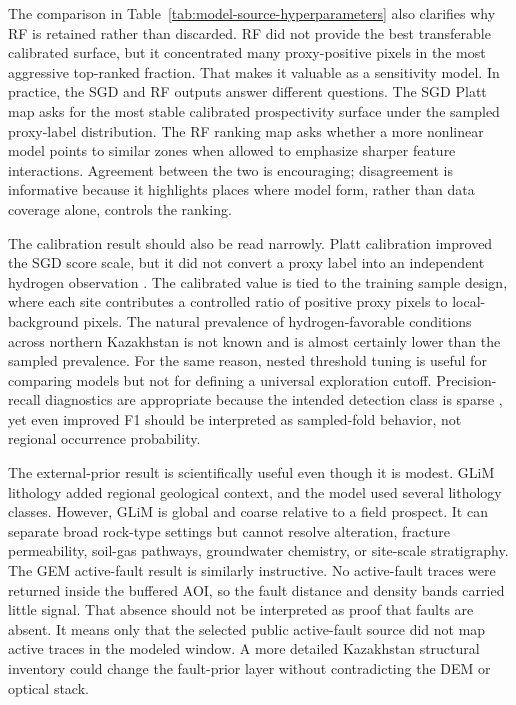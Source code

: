 \documentclass[numrefs]{interact}
\let\cite\citep
\theoremstyle{plain}%
\theoremstyle{definition}
\theoremstyle{remark}
\begin{document}
The comparison in Table~\ref{tab:model-source-hyperparameters} also clarifies why RF is retained rather than discarded. RF did not provide the best transferable calibrated surface, but it concentrated many proxy-positive pixels in the most aggressive top-ranked fraction. That makes it valuable as a sensitivity model. In practice, the SGD and RF outputs answer different questions. The SGD Platt map asks for the most stable calibrated prospectivity surface under the sampled proxy-label distribution. The RF ranking map asks whether a more nonlinear model points to similar zones when allowed to emphasize sharper feature interactions. Agreement between the two is encouraging; disagreement is informative because it highlights places where model form, rather than data coverage alone, controls the ranking.

The calibration result should also be read narrowly. Platt calibration improved the SGD score scale, but it did not convert a proxy label into an independent hydrogen observation \cite{platt1999probabilistic}. The calibrated value is tied to the training sample design, where each site contributes a controlled ratio of positive proxy pixels to local-background pixels. The natural prevalence of hydrogen-favorable conditions across northern Kazakhstan is not known and is almost certainly lower than the sampled prevalence. For the same reason, nested threshold tuning is useful for comparing models but not for defining a universal exploration cutoff. Precision-recall diagnostics are appropriate because the intended detection class is sparse \cite{saito2015precision}, yet even improved F1 should be interpreted as sampled-fold behavior, not regional occurrence probability.

The external-prior result is scientifically useful even though it is modest. GLiM lithology added regional geological context, and the model used several lithology classes. However, GLiM is global and coarse relative to a field prospect. It can separate broad rock-type settings but cannot resolve alteration, fracture permeability, soil-gas pathways, groundwater chemistry, or site-scale stratigraphy. The GEM active-fault result is similarly instructive. No active-fault traces were returned inside the buffered AOI, so the fault distance and density bands carried little signal. That absence should not be interpreted as proof that faults are absent. It means only that the selected public active-fault source did not map active traces in the modeled window. A more detailed Kazakhstan structural inventory could change the fault-prior layer without contradicting the DEM or optical stack.
\end{document}
